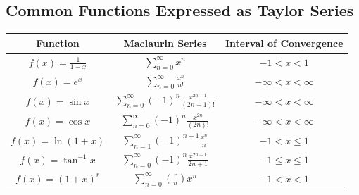 \documentclass{report}
\begin{document}
    \pagebreak 
    \subsection*{Common Functions Expressed as Taylor Series}
    \bigbreak \noindent 
    \begin{center}
        
    \begin{tabular}{|c|c|c|}
    \hline
    Function & Maclaurin Series & Interval of Convergence \\ \hline
    $f(x) = \frac{1}{1 - x}$ & $\sum_{n=0}^{\infty} x^n$ & $-1 < x < 1$ \\ \hline
    $f(x) = e^x$ & $\sum_{n=0}^{\infty} \frac{x^n}{n!}$ & $-\infty < x < \infty$ \\ \hline
    $f(x) = \sin x$ & $\sum_{n=0}^{\infty} (-1)^n \frac{x^{2n+1}}{(2n+1)!}$ & $-\infty < x < \infty$ \\ \hline
    $f(x) = \cos x$ & $\sum_{n=0}^{\infty} (-1)^n \frac{x^{2n}}{(2n)!}$ & $-\infty < x < \infty$ \\ \hline
    $f(x) = \ln(1 + x)$ & $\sum_{n=1}^{\infty} (-1)^{n+1} \frac{x^n}{n}$ & $-1 < x \leq 1$ \\ \hline
    $f(x) = \tan^{-1} x$ & $\sum_{n=0}^{\infty} (-1)^n \frac{x^{2n+1}}{2n+1}$ & $-1 \leq x \leq 1$ \\ \hline
    $f(x) = (1 + x)^r$ & $\sum_{n=0}^{\infty} \binom{r}{n} x^n$ & $-1 < x < 1$ \\ \hline
    \end{tabular}
    \end{center}
\end{document}
